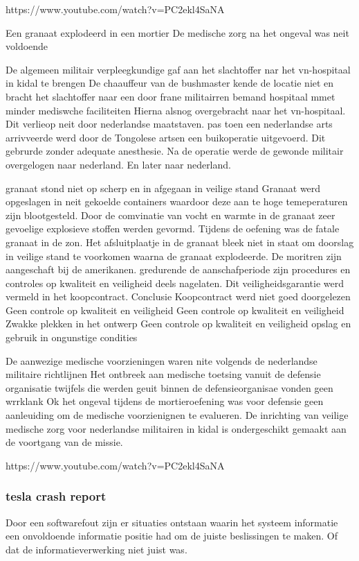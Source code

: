 https://www.youtube.com/watch?v=PC2ekl4SaNA 

 
Een granaat explodeerd in een mortier
De medische zorg na het ongeval was neit voldoende


De algemeen militair verpleegkundige gaf aan het slachtoffer nar het vn-hospitaal in kidal te brengen
De chaauffeur van de bushmaster kende de locatie niet  en bracht het slachtoffer naar een door frane militairren bemand hospitaal mmet minder mediswche faciliteiten
Hierna alsnog overgebracht naar het vn-hospitaal.
Dit verlieop  neit door nederlandse maatstaven.
pas toen een nederlandse arts arrivveerde werd door de Tongolese artsen een buikoperatie uitgevoerd.
Dit gebrurde zonder adequate anesthesie.
Na de operatie werde de gewonde militair overgelogen naar nederland. En later naar nederland.


granaat stond niet op scherp en in afgegaan in veilige stand
Granaat werd opgeslagen in neit gekoelde containers waardoor deze aan te hoge temeperaturen zijn blootgesteld.
Door de comvinatie van vocht en warmte in de granaat zeer gevoelige explosieve stoffen werden gevormd.
Tijdens de oefening was de fatale granaat in de zon.
Het afsluitplaatje in de granaat bleek niet in staat om doorslag in veilige stand te voorkomen waarna de granaat explodeerde.
De moritren zijn aangeschaft bij de amerikanen. gredurende de aanschafperiode zijn procedures en controles op kwaliteit en veiligheid deels nagelaten.
Dit veiligheidsgarantie werd vermeld in het koopcontract.
Conclusie
Koopcontract werd niet goed doorgelezen
Geen controle op kwaliteit en veiligheid
Geen controle op kwaliteit en veiligheid
Zwakke plekken in het ontwerp
Geen controle op kwaliteit en veiligheid
opslag en gebruik in ongunstige condities

De aanwezige medische voorzieningen waren nite volgends de nederlandse militaire richtlijnen
Het ontbreek aan medische toetsing vanuit de defensie organisatie
twijfels die werden geuit binnen de defensieorganisae vonden geen wrrklank
Ok het ongeval tijdens de mortieroefening was voor defensie geen aanleuiding om de medische voorzienignen te evalueren.
De inrichting van veilige medische zorg voor nederlandse militairen in kidal is ondergeschikt gemaakt aan de voortgang van de missie.


https://www.youtube.com/watch?v=PC2ekl4SaNA 
\subsubsection{tesla crash report}
Door een softwarefout zijn er situaties ontstaan waarin het systeem informatie een onvoldoende informatie positie had om de juiste beslissingen te maken. Of dat de informatieverwerking niet juist was.
 


